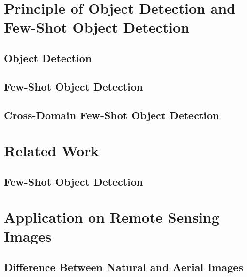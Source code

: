 \documentclass[xcolor=table, 8pt]{beamer}
\begin{document}
    \maketitle
    


    \section{Principle of Object Detection and Few-Shot Object Detection}\label{sec:od-fsod}

    \subsection{Object Detection}\label{subsec:od}
    

    \subsection{Few-Shot Object Detection}\label{subsec:few-shot-object-detection}
    

    \subsection{Cross-Domain Few-Shot Object Detection}\label{subsec:cd-fsod}
    


    \section{Related Work}\label{sec:fsod}

    \subsection{Few-Shot Object Detection}\label{subsec:fsod}
    


    \section{Application on Remote Sensing Images}

    \subsection{Difference Between Natural and Aerial Images}
    
\end{document}
